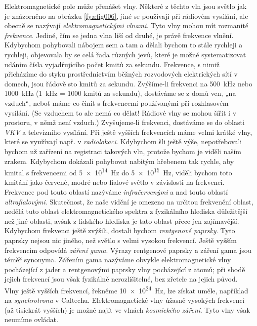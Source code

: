     Elektromagnetické pole může přenášet vlny. Některé z těchto vln jsou světlo jak je znázorněno 
    na obrázku \ref{fyz:fig006}, jiné se používají při rádiovém vysílání, ale obecně se 
    nazývají \emph{elektromagnetickými vlnami}. Tyto vlny mohou mít rozmanité \emph{frekvence}. 
    Jediné, čím se jedna vlna liší od druhé, je právě frekvence vlnění. Kdybychom pohybovali 
    nábojem sem a tam a dělali bychom to stále rychleji a rychleji, objevovala by se celá řada 
    různých jevů, které je možné systematizovat udáním čísla vyjadřujícího počet kmitů za sekundu. 
    Frekvence, s nimiž přicházíme do styku prostřednictvím běžných rozvodových elektrických sítí v 
    domech, jsou řádově sto kmitů za sekundu. Zvýšíme-li frekvenci na \SI{500}{\kHz} nebo 
    \SI{1000}{\kHz} (\SI{1}{\kHz} = 1000 kmitů za sekundu), dostáváme se z domů ven, „na 
    vzduch“, neboť máme co činit s frekvencemi používanými při rozhlasovém vysílání. (Se vzduchem 
    to ale nemá co dělat! Rádiové vlny se mohou šířit i v prostoru, v němž není vzduch.) 
    Zvyšujeme-li frekvenci, dostáváme se do oblasti \emph{VKV} a televizního vysílání. Při ještě 
    vyšších frekvencích máme velmi krátké vlny, které se využívají např. v \emph{radiolokaci}. 
    Kdybychom šli ještě výše, nepotřebovali bychom už zařízení na registraci takových vln, protože 
    bychom je viděli naším zrakem. Kdybychom dokázali pohybovat nabitým hřebenem tak rychle, aby 
    kmital s frekvencemi od \SI{5e14}{\Hz} do \SI{5e15}{\Hz}, viděli bychom toto kmitání jako 
    červené, modré nebo fialové světlo v závislosti na frekvenci. Frekvence pod touto oblastí 
    nazýváme \emph{infračervenými} a nad touto oblastí \emph{ultrafialovými}. Skutečnost, 
    že naše vidění je omezeno na určitou frekvenční oblast, nedělá tuto oblast elektromagnetického 
    spektra z fyzikálního hlediska důležitější než jiné oblasti, avšak z lidského hlediska je tato 
    oblast přece jen zajímavější. Kdybychom frekvenci ještě zvýšili, dostali bychom 
    \emph{rentgenové paprsky}. Tyto paprsky nejsou nic jiného, než světlo s velmi vysokou 
    frekvencí. Ještě vyšším frekvencím odpovídá \emph{záření gama}. Výrazy rentgenové paprsky a 
    záření gama jsou téměř synonyma. Zářením gama nazýváme obvykle elektromagnetické vlny 
    pocházející z jader a rentgenovými paprsky vlny pocházející z atomů; při shodě jejich frekvencí 
    jsou však fyzikálně nerozlišitelné, bez zřetele na jejich původ. Vlny ještě vyšších 
    frekvencí, řekněme \SI{10e24}{\Hz}, lze získat uměle, například na \emph{synchrotronu} v 
    Caltechu. Elektromagnetické vlny úžasně vysokých frekvencí (až tisíckrát vyšších) je možné 
    najít ve vlnách \emph{kosmického záření}. Tyto vlny však neumíme ovládat. 
    \cite[s.~29]{Feynman02}
  
